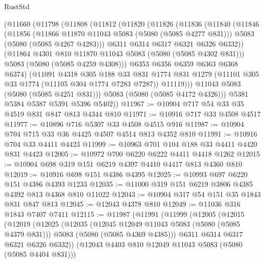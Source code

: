 \begin{lexlean}{RustStd}
\begin{coremodule}
      (@11660
        (@11798
          (@11808
            (@11812
              (@11820
                (@11826
                  (@11836
                    (@11840
                      (@11846
                        (@11856
                          (@11866 @11870 @11043 @5083 (@5080 (@5085 @4277 @831)))
                          @5083
                          (@5080 (@5085 @4267 @4283)))
                        @6311
                        @6314
                        @6317
                        @6321
                        @6326
                        @6332))
                    (@11864 @4301 @810 @11870 @11043 @5083 (@5080 (@5085 @4302 @831)))
                    @5083
                    (@5080 (@5085 @4259 @4308)))
                  @6353
                  @6356
                  @6359
                  @6363
                  @6368
                  @6374)
                (@11091
                  @4318
                  @305
                  @188
                  @33
                  @831
                  @1774
                  @831
                  @1279
                  (@11101 @305 @33 @1774 (@11105 @304 @1774 @7283 @7287))
                  @11119)))
            @11043
            @5083
            (@5080 (@5085 @4251 @831)))
          @5083
          (@5080 (@5085 @4172 @4326)))
        @5381
        @5384
        @5387
        @5391
        @5396
        @5402))
@11967 := @10904 @717 @54 @33 @35 @4519 @831 @847 @813 @4344 @810
@11971 := @10916 @717 @33 @4508 @4517
@11977 := @10896 @716 @5307 @33 @4508 @4515 @916
@11987 := @10904 @704 @715 @33 @36 @4425 @4507 @4514 @813 @4352 @810
@11991 := @10916 @704 @33 @4411 @4423
@11999 := @10963 @701 @104 @188 @33 @4411 @4420 @831 @4423
@12005 := @10972 @700 @6220 @6222 @4411 @4418 @1262
@12015 := @10904 @698 @319 @151 @6219 @4397 @4410 @4417 @813 @4360 @810
@12019 := @10916 @698 @151 @4386 @4395
@12025 := @10993 @697 @6220 @151 @4386 @4393 @1233
@12035 := @11000 @319 @151 @6219 @3806 @4385 @4392 @813 @4368 @810 @11022
@12043 := @10904 @317 @54 @151 @35 @1843 @831 @847 @813
@12045 := @12043 @4378 @810
@12049 := @11036 @316 @1843 @7407 @7411
@12115 := @11987
    (@11991
      (@11999
        (@12005
          (@12015
            (@12019
              (@12025
                (@12035
                  (@12045 @12049 @11043 @5083 (@5080 (@5085 @4379 @831)))
                  @5083
                  (@5080 (@5085 @4369 @4385)))
                @6311
                @6314
                @6317
                @6321
                @6326
                @6332))
            (@12043 @4403 @810 @12049 @11043 @5083 (@5080 (@5085 @4404 @831)))

\end{coremodule}
\end{lexlean}
